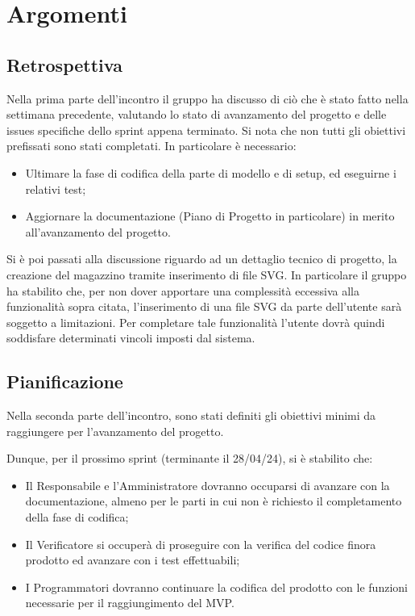\section{Argomenti}
\subsection{Retrospettiva}
    Nella prima parte dell'incontro il gruppo ha discusso di ciò che è stato fatto nella settimana precedente, valutando lo stato di avanzamento del progetto e delle issues
    specifiche dello sprint appena terminato. Si nota che non tutti gli obiettivi prefissati sono stati completati. In particolare è necessario: 
\begin{itemize}
    \item Ultimare la fase di codifica della parte di modello e di setup, ed eseguirne i relativi test;
    \item Aggiornare la documentazione (Piano di Progetto in particolare) in merito all'avanzamento del progetto.
\end{itemize}
Si è poi passati alla discussione riguardo ad un dettaglio tecnico di progetto, la creazione del magazzino tramite inserimento di file SVG.
In particolare il gruppo ha stabilito che, per non dover apportare una complessità eccessiva alla funzionalità sopra citata, l'inserimento di una file SVG da parte dell'utente
sarà soggetto a limitazioni. Per completare tale funzionalità l'utente dovrà quindi soddisfare determinati vincoli imposti dal sistema.

\subsection{Pianificazione}
Nella seconda parte dell'incontro, sono stati definiti gli obiettivi minimi da raggiungere per l'avanzamento del progetto.
\bigskip

\noindent Dunque, per il prossimo sprint (terminante il 28/04/24), si è stabilito che:
\begin{itemize}
    \item Il Responsabile e l'Amministratore dovranno occuparsi di avanzare con la documentazione, almeno per le parti in cui non è richiesto il completamento della fase di codifica;
    \item Il Verificatore si occuperà di proseguire con la verifica del codice finora prodotto ed avanzare con i test effettuabili;
    \item I Programmatori dovranno continuare la codifica del prodotto con le funzioni necessarie per il raggiungimento del MVP.
\end{itemize}

